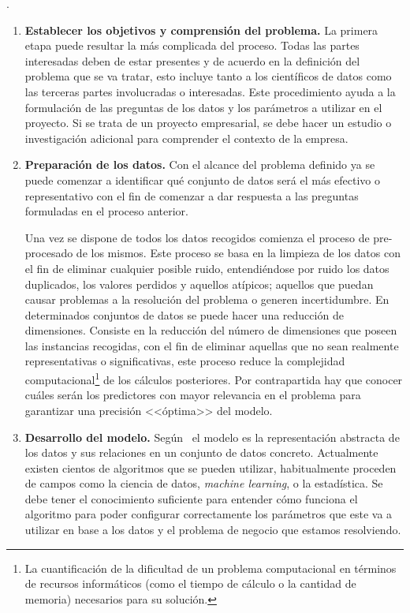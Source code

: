 .

\begin{enumerate}
   \item \textbf{Establecer los objetivos y comprensión del problema.}
    La primera etapa puede resultar la más complicada del proceso. Todas las partes interesadas deben de estar presentes y de acuerdo en la definición del problema que se va tratar, esto incluye tanto a los científicos de datos como las terceras partes involucradas o interesadas. 
    Este procedimiento ayuda a la formulación de las preguntas de los datos y los parámetros a utilizar en el proyecto. Si se trata de un proyecto empresarial, se debe hacer un estudio o investigación adicional para comprender el contexto de la empresa.
    \item \textbf{Preparación de los datos.}
    Con el alcance del problema definido ya se puede comenzar a identificar qué conjunto de datos será el más efectivo o representativo con el fin de comenzar a dar respuesta a las preguntas formuladas en el proceso anterior.
    
    Una vez se dispone de todos los datos recogidos comienza el proceso de pre-procesado de los mismos. Este proceso se basa en la limpieza de los datos con el fin de eliminar cualquier posible ruido, entendiéndose por ruido los datos duplicados, los valores perdidos y aquellos atípicos; aquellos que puedan causar problemas a la resolución del problema o generen incertidumbre.
    En determinados conjuntos de datos se puede hacer una reducción de dimensiones. Consiste en la reducción del número de dimensiones que poseen las instancias recogidas, con el fin de eliminar aquellas que no sean realmente representativas o significativas, este proceso reduce la complejidad computacional\footnote{La cuantificación de la dificultad de un problema computacional en términos de recursos informáticos (como el tiempo de cálculo o la cantidad de memoria) necesarios para su solución.} de los cálculos posteriores. Por contrapartida hay que conocer cuáles serán los predictores con mayor relevancia en el problema para garantizar una precisión <<óptima>> del modelo.
    \item \textbf{Desarrollo del modelo.}
    Según~\cite{KOTU201517} el modelo es la representación abstracta de los datos y sus relaciones en un conjunto de datos concreto. Actualmente existen cientos de algoritmos que se pueden utilizar, habitualmente proceden de campos como la ciencia de datos, \textit{machine learning}, o la estadística.
    Se debe tener el conocimiento suficiente para entender cómo funciona el algoritmo para poder configurar correctamente los parámetros que este va a utilizar en base a los datos y el problema de negocio que estamos resolviendo. 
    

\end{enumerate}
